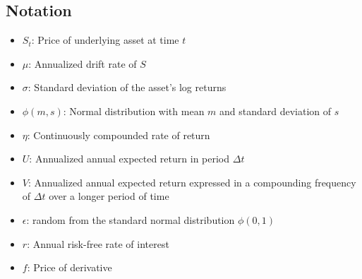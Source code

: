 \documentclass{article}
\begin{document}
\subsection{Notation}
\begin{itemize}
    \item $S_{t}$: Price of underlying asset at time $t$
    \item $\mu$: Annualized drift rate of $S$
    \item $\sigma$: Standard deviation of the asset's log returns
    \item $\phi (m,s)$: Normal distribution with mean $m$ and standard deviation of $s$
    \item $\eta$: Continuously compounded rate of return
    \item $U$: Annualized annual expected return in period $\Delta t$
    \item $V$: Annualized annual expected return expressed in a compounding frequency of $\Delta t$ over a longer period of time
    \item $\epsilon$: random from the standard normal distribution $\phi(0, 1)$
    \item $r$: Annual risk-free rate of interest
    \item $f$: Price of derivative
\end{itemize}
\end{document}
